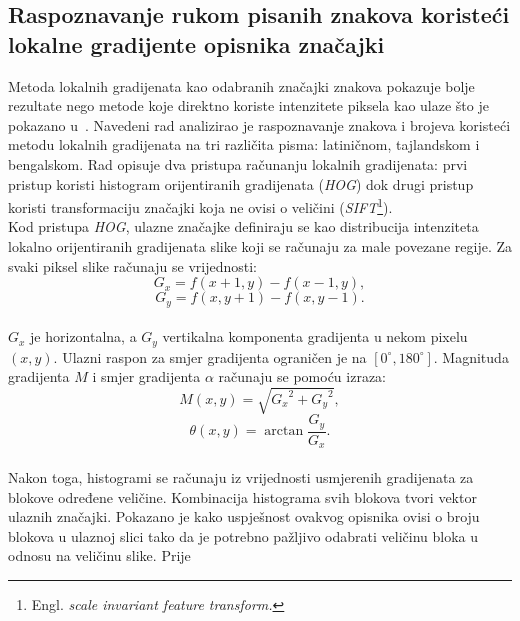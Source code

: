 \subsection{Raspoznavanje rukom pisanih znakova koristeći lokalne gradijente opisnika značajki}
\label{subsec:raspoznavanje-rukom-pisanih-znakova-koristeci-lokalne-gradijente-opisnika-znacajki}
Metoda lokalnih gradijenata kao odabranih značajki znakova pokazuje bolje rezultate nego metode koje direktno koriste
intenzitete piksela kao ulaze što je pokazano u\ \citep{surinta2015}. Navedeni rad analizirao je raspoznavanje znakova i
brojeva koristeći metodu lokalnih gradijenata na tri različita pisma: latiničnom, tajlandskom i bengalskom. Rad opisuje
dva pristupa računanju lokalnih gradijenata: prvi pristup koristi histogram orijentiranih gradijenata (\emph{HOG}) dok
drugi pristup koristi transformaciju značajki koja ne ovisi o veličini (\emph{SIFT}\footnote{Engl. \emph{scale invariant
feature transform.}}).\\
Kod pristupa \emph{HOG}, ulazne značajke definiraju se kao distribucija intenziteta lokalno orijentiranih gradijenata
slike koji se računaju za male povezane regije. Za svaki piksel slike računaju se vrijednosti:\\
\begin{equation}
    G_x = f(x + 1, y) - f(x - 1, y),\label{eq:grad-x}
\end{equation}
\begin{equation}
    G_y = f(x, y + 1) - f(x, y - 1).\label{eq:grad-y}
\end{equation}
\\
$G_x$ je horizontalna, a $G_y$ vertikalna komponenta gradijenta u nekom pixelu $(x, y)$. Ulazni raspon za smjer
gradijenta ograničen je na $[0^{\circ}, 180^{\circ}]$. Magnituda gradijenta $M$ i smjer gradijenta $\alpha$ računaju se pomoću
izraza:\\
\begin{equation}
    M(x, y) = \sqrt{{G_x}^2 + {G_y}^2},\label{eq:grad-magnitude}
\end{equation}
\begin{equation}
    \theta(x, y) = \arctan{\frac{G_y}{G_x}}.\label{eq:grad-angle}
\end{equation}
\\
Nakon toga, histogrami se računaju iz vrijednosti usmjerenih gradijenata za blokove određene veličine. Kombinacija
histograma svih blokova tvori vektor ulaznih značajki. Pokazano je kako uspješnost ovakvog opisnika ovisi o broju
blokova u ulaznoj slici tako da je potrebno pažljivo odabrati veličinu bloka u odnosu na veličinu slike. Prije
